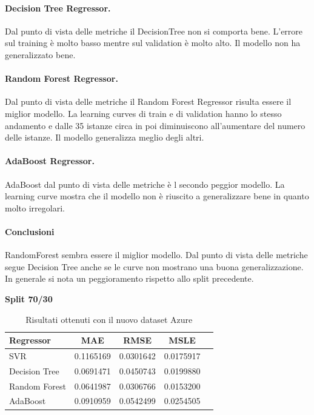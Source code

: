 \paragraph{\textbf{Decision Tree Regressor}.}
Dal punto di vista delle metriche il DecisionTree non si comporta bene. L'errore sul training è molto basso mentre sul validation è molto alto. Il modello non ha generalizzato bene.
\paragraph{\textbf{Random Forest Regressor}.}
Dal punto di vista delle metriche il Random Forest Regressor risulta essere il miglior modello.
La learning curves di train e di validation hanno lo stesso andamento e dalle 35 istanze circa in poi diminuiscono all'aumentare del numero delle istanze. Il modello generalizza meglio degli altri.
\paragraph{\textbf{AdaBoost Regressor}.}
AdaBoost dal punto di vista delle metriche è l secondo peggior modello. La learning curve mostra che il modello non è riuscito a generalizzare bene in quanto molto irregolari.

\paragraph{\textbf{Conclusioni}} RandomForest sembra essere il miglior modello. Dal punto di vista delle metriche segue Decision Tree anche se le curve non mostrano una buona generalizzazione. In generale si nota un peggioramento rispetto allo split precedente.



\noindent\textbf{Split 70/30}

\begin{table}[H]
    \centering
    \begin{tabular}{|>{\centering\arraybackslash}m{5cm}|c|c|c|c|}
        \hline
        \textbf{Regressor} & \textbf{MAE} & \textbf{RMSE} & \textbf{MSLE} \\ [10pt]
        \hline
        SVR & 0.1165169 & 0.0301642 & 0.0175917 \\ [10pt]
        \hline
        Decision Tree & 0.0691471 & 0.0450743 & 0.0199880 \\ [10pt]
        \hline
        Random Forest & 0.0641987 & 0.0306766 & 0.0153200 \\ [10pt]
        \hline
        AdaBoost & 0.0910959 & 0.0542499 & 0.0254505 \\ [10pt]
        \hline
    \end{tabular}
    \caption{Risultati ottenuti con il nuovo dataset Azure}
    \label{tab:results}
\end{table}

